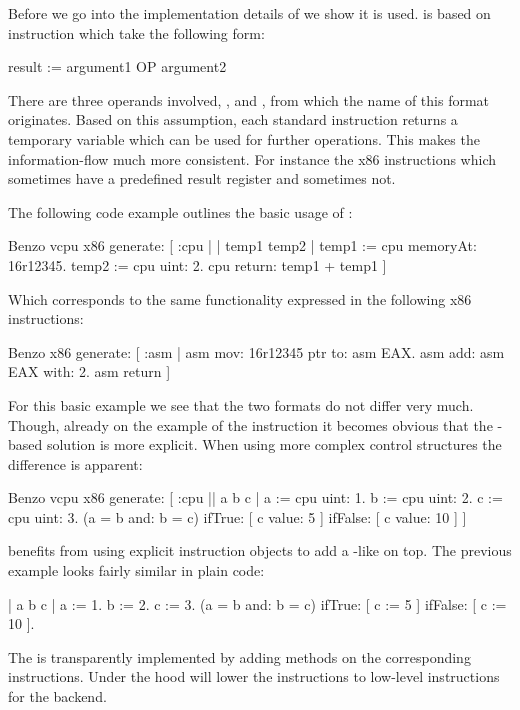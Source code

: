 Before we go into the implementation details of \VCPU we show it is used.
\VCPU is based on \TAC instruction which take the following form:
%
\begin{stcode}{}
result := argument1 OP argument2
\end{stcode}
%
There are three operands involved, ,  and , from which the name of this \TAC format originates.
Based on this assumption, each standard \VCPU instruction returns a temporary variable which can be used for further operations.
This makes the information-flow much more consistent.
For instance the x86 instructions which sometimes have a predefined result register and sometimes not.

The following code example outlines the basic usage of \VCPU:
%
\begin{stcode}[
	label={lst:future-benzo-problem-vcpu}, 
	caption={Basic \VCPU Example}
]{}
Benzo vcpu x86 generate: [ :cpu | | temp1 temp2 |
	temp1 := cpu memoryAt: 16r12345.
	temp2 := cpu uint: 2.
	cpu return: temp1 + temp1 ]
\end{stcode}
%
Which corresponds to the same functionality expressed in the following x86 instructions:
%
\begin{stcode}{}
Benzo x86 generate: [ :asm |
	asm mov: 16r12345 ptr to: asm EAX.
	asm add: asm EAX with: 2.
	asm return ]
\end{stcode}
%
For this basic example we see that the two formats do not differ very much.
Though, already on the example of the  instruction it becomes obvious that the \TAC-based solution is more explicit.
When using more complex control structures the difference is apparent:
\begin{stcode}{}
Benzo vcpu x86 generate: [ :cpu || a b c |
	a := cpu uint: 1.
	b := cpu uint: 2.
	c := cpu uint: 3.
	(a = b and: b = c) 
		ifTrue:  [ c value: 5  ] 
		ifFalse: [ c value: 10 ] ]
\end{stcode}
%
\VCPU benefits from using explicit instruction objects to add a \PH-like \DSL on top.
The previous example looks fairly similar in plain \PH code:
%
\begin{stcode}{}
| a b c |
a := 1.
b := 2.
c := 3.
(a = b and: b = c) 
	ifTrue:  [ c := 5  ] 
	ifFalse: [ c := 10 ].
\end{stcode}
%
The \DSL is transparently implemented by adding \PH methods on the corresponding \VCPU instructions.
Under the hood \VCPU will lower the \TAC instructions to low-level \ASM instructions for the \AsmJIT backend.

